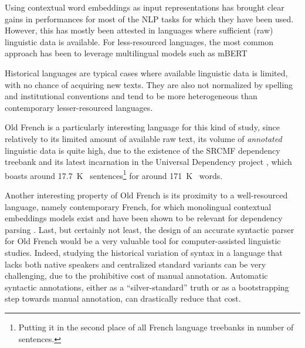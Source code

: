 Using contextual word embeddings as input representations has brought clear gains in performances for most of the NLP tasks for which they have been used.
However, this has mostly been attested in languages where sufficient (raw) linguistic data is available.
For less-resourced languages, the most common approach has been to leverage multilingual models such as mBERT \citep{devlin-etal-2019-bert}

Historical languages are typical cases where available linguistic data is limited, with no chance of acquiring new texts. They are also not normalized by spelling and institutional conventions and tend to be more heterogeneous than contemporary lesser-resourced languages.

Old French is a particularly interesting language for this kind of study, since relatively to its limited amount of available raw text, its volume of \emph{annotated} linguistic data is quite high, due to the existence of the SRCMF dependency treebank \citep{prevost-stein-2013-syntactic} and its latest incarnation in the Universal Dependency project \citep{nivre-etal-2020-universal}, which boasts around \SI{17.7}{K\quantity} sentences\footnote{Putting it in the second place of all French language treebanks in number of sentences.}
for around \SI{171}{K\quantity} words.

Another interesting property of Old French is its proximity to a well-resourced language, namely contemporary French, for which monolingual contextual embeddings models exist and have been shown to be relevant for dependency parsing  \citep{le-etal-2020-flaubert,martin-etal-2020-camembert}.
Last, but certainly not least, the design of an accurate syntactic parser for Old French would be a very valuable tool for computer-assisted linguistic studies.
Indeed, studying the historical variation of syntax in a language that lacks both native speakers and centralized standard variants can be very challenging, due to the prohibitive cost of manual annotation. Automatic syntactic annotations, either as a \enquote{silver-standard} truth or as a bootstrapping step towards manual annotation, can drastically reduce that cost.

